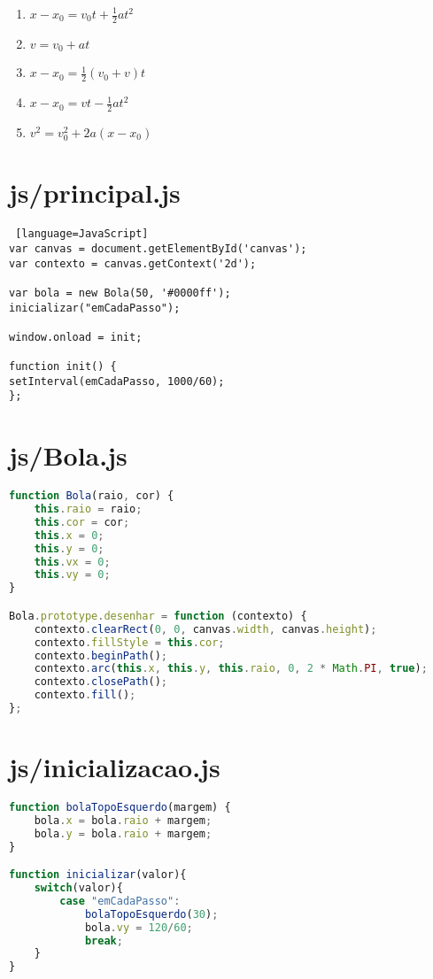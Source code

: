 \documentclass[12pt,a4paper,oneside]{article}
\begin{document}
\begin{enumerate}
\item $x - x_0 = v_0t + \frac{1}{2}at^2$ 
\item $v = v_0 + at$ 
\item $x - x_0 = \frac{1}{2}(v_0 + v)t$ 
\item $x - x_0 = vt - \frac{1}{2} a t^2$
\item $v^2 = v_0^2 + 2a(x - x_0)$
\end{enumerate}

\section*{js/principal.js}

\begin{lstlisting} [language=JavaScript]
var canvas = document.getElementById('canvas');
var contexto = canvas.getContext('2d');

var bola = new Bola(50, '#0000ff');
inicializar("emCadaPasso");

window.onload = init;

function init() {
setInterval(emCadaPasso, 1000/60);
};
\end{lstlisting}

\newpage

\section*{js/Bola.js}

\begin{lstlisting}[language=JavaScript]
function Bola(raio, cor) {
	this.raio = raio;
	this.cor = cor;
	this.x = 0;
	this.y = 0;
	this.vx = 0;
	this.vy = 0;
}

Bola.prototype.desenhar = function (contexto) {
	contexto.clearRect(0, 0, canvas.width, canvas.height);
	contexto.fillStyle = this.cor;
	contexto.beginPath();
	contexto.arc(this.x, this.y, this.raio, 0, 2 * Math.PI, true);
	contexto.closePath();
	contexto.fill();
};
\end{lstlisting}

\section*{js/inicializacao.js}

\begin{lstlisting}[language=JavaScript]
function bolaTopoEsquerdo(margem) {
	bola.x = bola.raio + margem;
	bola.y = bola.raio + margem;
}

function inicializar(valor){
	switch(valor){
		case "emCadaPasso":
			bolaTopoEsquerdo(30);
			bola.vy = 120/60; 
			break;
	}
}
\end{lstlisting}
\end{document}
